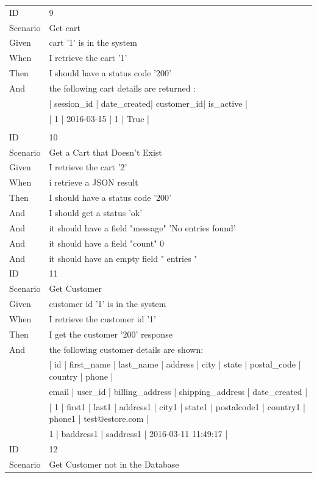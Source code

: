 \documentclass{report}
\begin{document}
\begin{tabular}{ l l }
ID 			& 9 \\
Scenario		& Get cart \\
Given 		& cart '1' is in the system \\
When 		& I retrieve the cart '1' \\
Then 		& I should have a status code '200' \\
And 			& the following cart details are returned : \\
		    & | session\_id | date\_created| customer\_id| is\_active | \\
      		& | 1          | 2016-03-15  | 1          | True      | \\ \\
ID 			& 10 \\
Scenario		& Get a Cart that Doesn't Exist \\
Given 		& I retrieve the cart '2' \\
When 		& i retrieve a JSON result \\
Then 		& I should have a status code '200' \\
And 			& I should get a status 'ok' \\
And 			& it should  have a field "message" 'No entries found' \\
And 			& it should  have a field "count" 0 \\
And 			& it should  have an empty field " entries " \\
ID 			& 11 \\
Scenario		& Get Customer \\
Given 		& customer id '1' is in the system \\
When 		& I retrieve the customer id '1' \\
Then 		& I get the customer '200' response \\
And 			& the following customer details are shown: \\
 			& | id | first\_name | last\_name | address | city | state | postal\_code | country | phone | \\
 			& email | user\_id | billing\_address | shipping\_address | date\_created | \\
    			& | 1 | first1 | last1 | address1 | city1 | state1 | postalcode1 | country1 | phone1 | test@estore.com | \\
    			& 1 | baddress1 | saddress1 | 2016-03-11 11:49:17 | \\
ID 			& 12 \\
Scenario		& Get Customer not in the Database \\

\end{tabular}
\end{document}
